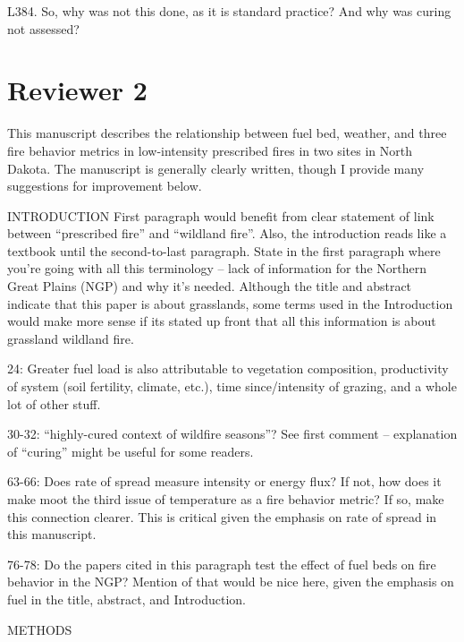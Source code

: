 \documentclass[parskip=half]{scrartcl}
\begin{document}
L384. So, why was not this done, as it is standard practice? And why was curing not assessed?



\section*{Reviewer 2}

This manuscript describes the relationship between fuel bed, weather, and three fire behavior metrics in low-intensity prescribed fires in two sites in North Dakota. The manuscript is generally clearly written, though I provide many suggestions for improvement below.

INTRODUCTION
First paragraph would benefit from clear statement of link between ``prescribed fire'' and ``wildland fire''. Also, the introduction reads like a textbook until the second-to-last paragraph. State in the first paragraph where you’re going with all this terminology – lack of information for the Northern Great Plains (NGP) and why it’s needed. Although the title and abstract indicate that this paper is about grasslands, some terms used in the Introduction would make more sense if its stated up front that all this information is about grassland wildland fire.

24: Greater fuel load is also attributable to vegetation composition, productivity of system (soil fertility, climate, etc.), time since/intensity of grazing, and a whole lot of other stuff.

30-32:  ``highly-cured context of wildfire seasons''?  See first comment – explanation of ``curing'' might be useful for some readers.

63-66:  Does rate of spread measure intensity or energy flux? If not, how does it make moot the third issue of temperature as a fire behavior metric? If so, make this connection clearer. This is critical given the emphasis on rate of spread in this manuscript.

76-78:  Do the papers cited in this paragraph test the effect of fuel beds on fire behavior in the NGP? Mention of that would be nice here, given the emphasis on fuel in the title, abstract, and Introduction.

METHODS
\end{document}
